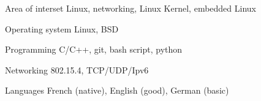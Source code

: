 

\begin{cvskills}

  \cvskill
    {Area of interset} %
    {Linux, networking, Linux Kernel, embedded Linux} %

  \cvskill
    {Operating system} %
    {Linux, BSD} %

  \cvskill
    {Programming} %
    {C/C++, git, bash script, python} %

  \cvskill
    {Networking} %
    {802.15.4, TCP/UDP/Ipv6} %

  \cvskill
    {Languages} %
    {French (native), English (good), German (basic)} %

\end{cvskills}
